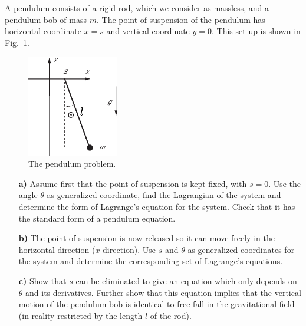 \documentclass[11pt,a4paper]{report}
\newcounter{excount}[chapter]
\newenvironment{exercise}[1][]{\addtocounter{excount}{1} \noindent {\bf Problem
    \arabic{excount} \ \ #1}\hspace{2mm}}{\vspace{4mm}}
\begin{document}
\begin{exercise}
A pendulum consists of a rigid rod, which we consider as massless, and a pendulum bob of mass $m$. The point of suspension of the pendulum has horizontal coordinate $x=s$ and vertical coordinate $y=0$. This set-up is shown in Fig.~\ref{fig:pendulum}.

\begin{figure}[h]
\begin{center}
\includegraphics[width=4cm]{Pendulum.eps}
\end{center}
\caption{The pendulum problem.}
\label{fig:pendulum}
\end{figure}

\begin{itemize}
\item[\bf a)] Assume first that the point of suspension is kept fixed, with $s=0$. Use the angle $\theta$ as generalized coordinate, find the Lagrangian of the system and determine the form of Lagrange's equation for the system. Check that it has the standard form of a pendulum equation. 
\item[\bf b)] The point of suspension is now released so it can move freely in the horizontal direction ($x$-direction). Use $s$ and $\theta$ as generalized coordinates for the system and determine the corresponding set of Lagrange's equations. 
\item[\bf c)] Show that $s$ can be eliminated to give an equation which only depends on $\theta$ and its derivatives. Further show that this equation implies that the vertical motion of the pendulum bob is  identical to free fall in the gravitational field (in reality restricted by the length $l$ of the rod). 
\end{itemize}
\end{exercise}
\end{document}
